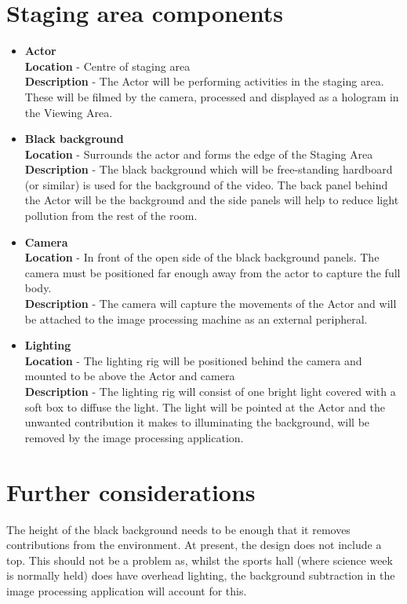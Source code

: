 \documentclass{article}
\begin{document}
\section{Staging area components}
\begin{itemize}
	\item \textbf{Actor}\\
	\textbf{Location} - Centre of staging area \\
	\textbf{Description} - The Actor will be performing activities in the staging area. These will be filmed by the camera, processed and displayed as a hologram in the Viewing Area.
	
	\item \textbf{Black background}\\
	\textbf{Location} - Surrounds the actor and forms the edge of the Staging Area\\
	\textbf{Description} - The black background which will be free-standing hardboard (or similar) is used for the background of the video. The back panel behind the Actor will be the background and the side panels will help to reduce light pollution from the rest of the room.
	
	\item \textbf{Camera}\\
	\textbf{Location} - In front of the open side of the black background panels. The camera must be positioned far enough away from the actor to capture the full body.\\
	\textbf{Description} - The camera will capture the movements of the Actor and will be attached to the image processing machine as an external peripheral. 
	
	\item \textbf{Lighting}\\
	\textbf{Location} - The lighting rig will be positioned behind the camera and mounted to be above the Actor and camera \\
	\textbf{Description} - The lighting rig will consist of one bright light covered with a soft box to diffuse the light. The light will be pointed at the Actor and the unwanted contribution it makes to illuminating the background, will be removed by the image processing application.

\end{itemize}

\section{Further considerations}
The height of the black background needs to be enough that it removes contributions from the environment. At present, the design does not include a top. This should not be a problem as, whilst the sports hall (where science week is normally held) does have overhead lighting, the background subtraction in the image processing application will account for this.
\end{document}
